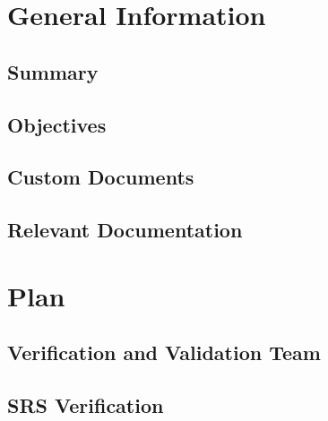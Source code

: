 \documentclass[12pt, titlepage]{article}
\begin{document}

\newpage




\section{General Information}

\subsection{Summary}



\subsection{Objectives}



\subsection{Custom Documents}



\subsection{Relevant Documentation}



\section{Plan}



\subsection{Verification and Validation Team}



\subsection{SRS Verification}
\end{document}
